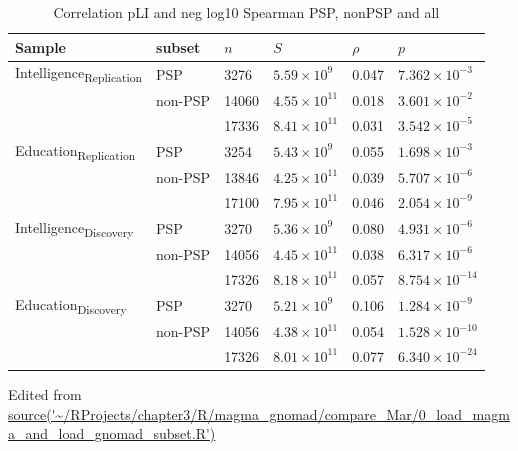\begin{table}[ht]
\centering
\setlength{\extrarowheight}{2pt}
\begin{tabular}{llllll}
  \toprule
Sample & subset & $n$ &$S$ & $\rho$ & $p$ \\ 
  \midrule
Intelligence\textsubscript{Replication} & PSP & 3276 & $5.59 \times 10^{9}$ & 0.047 & $7.362 \times 10^{-3}$ \\ 
 & non-PSP & 14060 & $4.55 \times 10^{11}$ & 0.018 & $3.601 \times 10^{-2}$ \\ 
 &  & 17336 & $8.41 \times 10^{11}$ & 0.031 & $3.542 \times 10^{-5}$  \vspace{9pt}\\ 

  Education\textsubscript{Replication} & PSP & 3254 & $5.43 \times 10^{9}$ & 0.055 & $1.698 \times 10^{-3}$ \\ 
 & non-PSP & 13846 & $4.25 \times 10^{11}$ & 0.039 & $5.707 \times 10^{-6}$ \\ 
 &  & 17100 & $7.95 \times 10^{11}$ & 0.046 & $2.054 \times 10^{-9}$\vspace{9pt} \\ 
  
  Intelligence\textsubscript{Discovery} & PSP & 3270 & $5.36 \times 10^{9}$ & 0.080 & $4.931 \times 10^{-6}$ \\ 
 & non-PSP & 14056 & $4.45 \times 10^{11}$ & 0.038 & $6.317 \times 10^{-6}$ \\ 
 &  & 17326 & $8.18 \times 10^{11}$ & 0.057 & $8.754 \times 10^{-14}$ \vspace{9pt}\\ 
  
  Education\textsubscript{Discovery} & PSP & 3270 & $5.21 \times 10^{9}$ & 0.106 & $1.284 \times 10^{-9}$ \\ 
  & non-PSP & 14056 & $4.38 \times 10^{11}$ & 0.054 & $1.528 \times 10^{-10}$ \\ 
 &  & 17326 & $8.01 \times 10^{11}$ & 0.077 & $6.340 \times 10^{-24}$ \\ 
   \bottomrule
\end{tabular}
\caption{Correlation pLI and neg log10 Spearman PSP, nonPSP and all} 
\tiny Edited from \url{source('~/RProjects/chapter3/R/magma_gnomad/compare_Mar/0_load_magma_and_load_gnomad_subset.R')} 
\label{tab: Correlation pLI and neg log10 SpearmanPSP, nonPSP and all}
\end{table}



